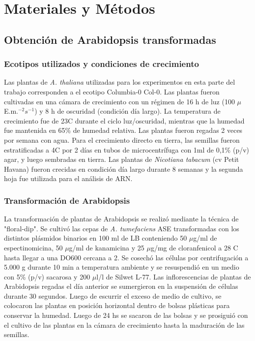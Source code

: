 \graphicspath{{Materials/Figs/}}

\setcounter{chapter}{3}
\chapter*{Materiales y Métodos} 
\setcounter{figure}{0}
\setcounter{table}{0}
\setcounter{section}{0}


\section{Obtención de Arabidopsis transformadas}

\subsection{Ecotipos utilizados y condiciones de crecimiento}
Las plantas de  \textit{A. thaliana} utilizadas para los experimentos en esta parte del trabajo corresponden a el ecotipo Columbia-0 Col-0.
Las plantas fueron cultivadas en una cámara de crecimiento con un régimen de 16 h de luz (100 $\mu$E.m.$^{-2}s^{-1}$) y 8 h de oscuridad (condición día largo).
La temperatura de crecimiento fue de 23\degree C durante el ciclo luz/oscuridad, mientras que la humedad fue mantenida en 65\% de humedad relativa.
Las plantas fueron regadas 2 veces por semana con agua.
Para el crecimiento directo en tierra, las semillas fueron estratificadas a 4\degree C por 2 días en tubos de microcentrífuga con 1ml de 0,1\% (p/v) agar, y luego sembradas en tierra.
Las plantas de \textit{Nicotiana tabacum} (cv Petit Havana) fueron crecidas en condición día largo durante 8 semanas y la segunda hoja fue utilizada para el análisis de ARN.

\subsection{Transformación de Arabidopsis}

La transformación de plantas de Arabidopsis se realizó mediante la técnica de "floral-dip".
Se cultivó las cepas de \textit{A. tumefaciens} ASE transformadas con los distintos plásmidos binarios en 100 ml de LB conteniendo 50 $\mu$g/ml de espectinomicina, 50 $\mu$g/ml de kanamicina y 25 $\mu$g/mg de cloranfenicol a 28 \degree C hasta llegar a una DO600 cercana a 2.
Se cosechó las células por centrifugación a 5.000 g durante 10 min a temperatura ambiente y se resuspendió en un medio con 5\% (p/v) sacarosa y 200 $\mu$l/l de Silwet L-77.
Las inflorescencias de plantas de Arabidopsis regadas el día anterior se sumergieron en la suspensión de células durante 30 segundos.
Luego de escurrir el exceso de medio de cultivo, se colocaron las plantas en posición horizontal dentro de bolsas plásticas para conservar la humedad.
Luego de 24 hs se sacaron de las bolsas y se prosiguió con el cultivo de las plantas en la cámara de crecimiento hasta la maduración de las semillas.


